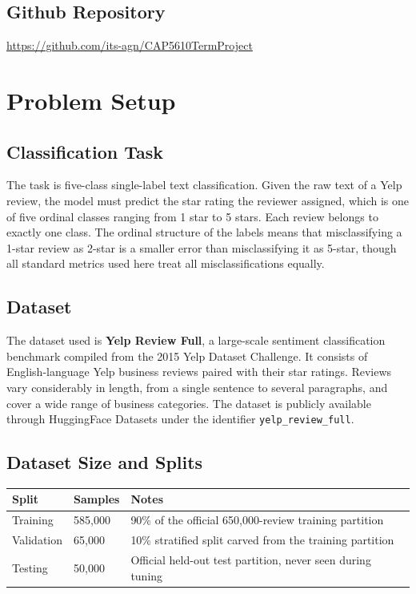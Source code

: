 \documentclass[12pt]{article}
\begin{document}
\subsection{Github Repository}
\url{https://github.com/its-agn/CAP5610TermProject}

\section{Problem Setup}
\label{sec:prob-setup}

\subsection{Classification Task}

The task is five-class single-label text classification. Given the raw text of a Yelp review, the model must predict the star rating the reviewer assigned, which is one of five ordinal classes ranging from 1 star to 5 stars. Each review belongs to exactly one class. The ordinal structure of the labels means that misclassifying a 1-star review as 2-star is a smaller error than misclassifying it as 5-star, though all standard metrics used here treat all misclassifications equally.

\subsection{Dataset}

The dataset used is \textbf{Yelp Review Full}, a large-scale sentiment classification benchmark compiled from the 2015 Yelp Dataset Challenge. It consists of English-language Yelp business reviews paired with their star ratings. Reviews vary considerably in length, from a single sentence to several paragraphs, and cover a wide range of business categories. The dataset is publicly available through HuggingFace Datasets under the identifier \texttt{yelp\_review\_full}.

\subsection{Dataset Size and Splits}

\begin{table}[H]
    \centering
    \begin{tabular}{lll}
        \toprule
        Split      & Samples   & Notes \\
        \midrule
        Training   & 585,000   & 90\% of the official 650,000-review training partition \\
        Validation & 65,000    & 10\% stratified split carved from the training partition \\
        Testing    & 50,000    & Official held-out test partition, never seen during tuning \\
        \bottomrule
    \end{tabular}
\end{table}
\end{document}
